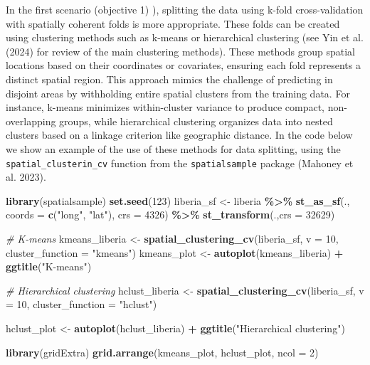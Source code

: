 \documentclass[
  letterpaper,
]{krantz}
\newenvironment{Shaded}{\begin{snugshade}}{\end{snugshade}}
\newcommand{\AttributeTok}[1]{\textcolor[rgb]{0.13,0.29,0.53}{#1}}
\newcommand{\CommentTok}[1]{\textcolor[rgb]{0.56,0.35,0.01}{\textit{#1}}}
\newcommand{\DecValTok}[1]{\textcolor[rgb]{0.00,0.00,0.81}{#1}}
\newcommand{\FunctionTok}[1]{\textcolor[rgb]{0.13,0.29,0.53}{\textbf{#1}}}
\newcommand{\NormalTok}[1]{#1}
\newcommand{\OtherTok}[1]{\textcolor[rgb]{0.56,0.35,0.01}{#1}}
\newcommand{\SpecialCharTok}[1]{\textcolor[rgb]{0.81,0.36,0.00}{\textbf{#1}}}
\newcommand{\StringTok}[1]{\textcolor[rgb]{0.31,0.60,0.02}{#1}}
\begin{document}
In the first scenario (objective 1) ), splitting the data using k-fold
cross-validation with spatially coherent folds is more appropriate.
These folds can be created using clustering methods such as k-means or
hierarchical clustering (see Yin et al. (2024) for review of the main
clustering methods). These methods group spatial locations based on
their coordinates or covariates, ensuring each fold represents a
distinct spatial region. This approach mimics the challenge of
predicting in disjoint areas by withholding entire spatial clusters from
the training data. For instance, k-means minimizes within-cluster
variance to produce compact, non-overlapping groups, while hierarchical
clustering organizes data into nested clusters based on a linkage
criterion like geographic distance. In the code below we show an example
of the use of these methods for data splitting, using the
\texttt{spatial\_clusterin\_cv} function from the \texttt{spatialsample}
package (Mahoney et al. 2023).

\begin{Shaded}
\begin{Highlighting}[]
\FunctionTok{library}\NormalTok{(spatialsample)}
\FunctionTok{set.seed}\NormalTok{(}\DecValTok{123}\NormalTok{)}
\NormalTok{liberia\_sf }\OtherTok{\textless{}{-}}\NormalTok{ liberia }\SpecialCharTok{\%\textgreater{}\%}
              \FunctionTok{st\_as\_sf}\NormalTok{(., }\AttributeTok{coords =} \FunctionTok{c}\NormalTok{(}\StringTok{"long"}\NormalTok{, }\StringTok{"lat"}\NormalTok{),}
                       \AttributeTok{crs =} \DecValTok{4326}\NormalTok{) }\SpecialCharTok{\%\textgreater{}\%}
              \FunctionTok{st\_transform}\NormalTok{(.,}\AttributeTok{crs =} \DecValTok{32629}\NormalTok{)}


\CommentTok{\# K{-}means}
\NormalTok{kmeans\_liberia }\OtherTok{\textless{}{-}} \FunctionTok{spatial\_clustering\_cv}\NormalTok{(liberia\_sf,}
                      \AttributeTok{v =} \DecValTok{10}\NormalTok{, }\AttributeTok{cluster\_function =} \StringTok{"kmeans"}\NormalTok{)}
\NormalTok{kmeans\_plot }\OtherTok{\textless{}{-}} \FunctionTok{autoplot}\NormalTok{(kmeans\_liberia) }\SpecialCharTok{+} \FunctionTok{ggtitle}\NormalTok{(}\StringTok{"K{-}means"}\NormalTok{)}

\CommentTok{\# Hierarchical clustering}
\NormalTok{hclust\_liberia }\OtherTok{\textless{}{-}} \FunctionTok{spatial\_clustering\_cv}\NormalTok{(liberia\_sf,}
                      \AttributeTok{v =} \DecValTok{10}\NormalTok{, }\AttributeTok{cluster\_function =} \StringTok{"hclust"}\NormalTok{) }
                   

\NormalTok{hclust\_plot }\OtherTok{\textless{}{-}} \FunctionTok{autoplot}\NormalTok{(hclust\_liberia) }\SpecialCharTok{+}
  \FunctionTok{ggtitle}\NormalTok{(}\StringTok{"Hierarchical clustering"}\NormalTok{)}

\FunctionTok{library}\NormalTok{(gridExtra)}
\FunctionTok{grid.arrange}\NormalTok{(kmeans\_plot, hclust\_plot, }\AttributeTok{ncol =} \DecValTok{2}\NormalTok{)}
\end{Highlighting}
\end{Shaded}
\end{document}
